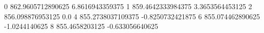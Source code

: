 0 862.9605712890625 6.8616943359375
1 859.4642333984375 3.3653564453125
2 856.098876953125 0.0
4 855.2738037109375 -0.8250732421875
6 855.074462890625 -1.0244140625
8 855.4658203125 -0.633056640625
